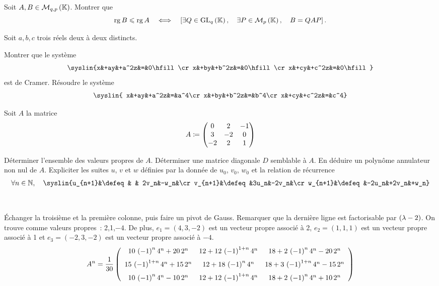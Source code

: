 \documentclass{magnolia}
\begin{document}

Soit $A,B\in\mathcal{M}_{q,p}\left(\mathbb{K}\right)$. Montrer que
\[\operatorname{rg} B \leqslant \operatorname{rg} A \quad\Longleftrightarrow\quad \left[\exists Q\in{\rm GL}_{q}\left(\mathbb{K}\right) ,\quad
  \exists P\in\mathcal{M}_{p}\left(\mathbb{K}\right) ,\quad B=QAP\right].\]





Soit $a,b,c$ trois réels deux à deux distincts.
\begin{questions}
\question Montrer que le système
  \[\syslin{x&+ay&+a^2z&=&0\hfill\cr
            x&+by&+b^2z&=&0\hfill\cr
            x&+cy&+c^2z&=&0\hfill}\]
  est de Cramer.
\question Résoudre le système
  \[\syslin{
  x&+ay&+a^2z&=&a^4\cr
  x&+by&+b^2z&=&b^4\cr
  x&+cy&+c^2z&=&c^4}\]
\end{questions}




Soit $A$ la matrice
\[A\coloneqq
  \begin{pmatrix}
  0  & 2  & -1\\
  3 & -2  & 0\\
  -2  & 2  & 1  
  \end{pmatrix}\]
\begin{questions}
\question Déterminer l'ensemble des valeurs propres de $A$.
\question Déterminer une matrice diagonale $D$ semblable à $A$. En déduire un
  polynôme annulateur non nul de $A$.
\question Expliciter les suites $u$, $v$ et $w$ définies par la donnée de
  $u_0$, $v_0$, $w_0$ et la relation de récurrence
  \[\forall n\in\N\qsep \syslin{u_{n+1}&\defeq&    & 2v_n&-w_n&\cr
            v_{n+1}&\defeq&3u_n&-2v_n&\cr
            w_{n+1}&\defeq&-2u_n&+2v_n&+w_n}\]
\end{questions}
\begin{sol}
$\quad$  
\begin{questions}
\question Échanger la troisième et la première colonne, puis faire un pivot de
  Gauss. Remarquer que la dernière ligne est factorisable par $\left(\lambda-2\right)$.
  On trouve comme valeurs propres~: 2,1,$-4$.
  De plus, $e_1=(4,3,-2)$ est un vecteur propre associé à 2, $e_2=(1,1,1)$
  est un vecteur propre associé à 1 et $e_3=(-2,3,-2)$ est un vecteur
  propre associé à $-4$.
\question
\question
  \[A^n=\frac{1}{30}\left( \begin {array}{ccc} 10\, \left( -1 \right) ^{n}{4}^{n}+20\,{2}
  ^{n}&12+12\, \left( -1 \right) ^{1+n}{4}^{n}&18+2\, \left( -1 \right) 
  ^{n}{4}^{n}-20\,{2}^{n}\\\noalign{\medskip}15\, \left( -1 \right) ^{1+
  n}{4}^{n}+15\,{2}^{n}&12+18\, \left( -1 \right) ^{n}{4}^{n}&18+3\,
   \left( -1 \right) ^{1+n}{4}^{n}-15\,{2}^{n}\\\noalign{\medskip}10\,
   \left( -1 \right) ^{n}{4}^{n}-10\,{2}^{n}&12+12\, \left( -1 \right) ^
  {1+n}{4}^{n}&18+2\, \left( -1 \right) ^{n}{4}^{n}+10\,{2}^{n}
  \end {array} \right) \]
\end{questions}
\end{sol}
\end{document}
